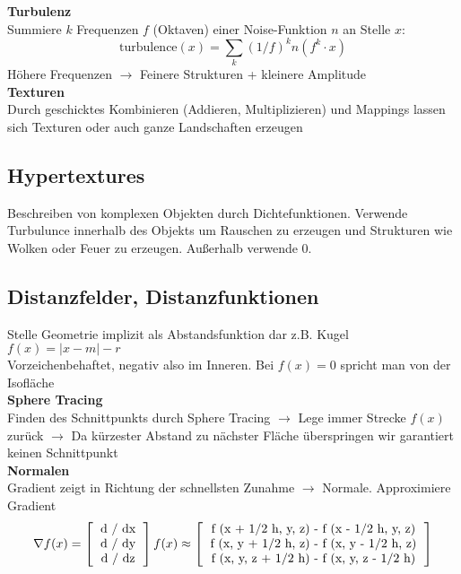 \textbf{Turbulenz}\\
Summiere $k$ Frequenzen $f$ (Oktaven) einer Noise-Funktion $n$ an Stelle $x$:\\
$$\text{turbulence}(x) = \sum_k (1 / f)^k n(f^k \cdot x)$$
Höhere Frequenzen $\rightarrow$ Feinere Strukturen + kleinere Amplitude\\

\textbf{Texturen}\\
Durch geschicktes Kombinieren (Addieren, Multiplizieren) und Mappings lassen sich Texturen oder auch
ganze Landschaften erzeugen

\subsection{Hypertextures}%
\label{pm:sub:hypertextures}

Beschreiben von komplexen Objekten durch Dichtefunktionen. Verwende Turbulunce innerhalb des Objekts
um Rauschen zu erzeugen und Strukturen wie Wolken oder Feuer zu erzeugen. Außerhalb verwende 0.

\subsection{Distanzfelder, Distanzfunktionen}%
\label{pm:sub:distanzfelder_distanzfunktionen}

Stelle Geometrie implizit als Abstandsfunktion dar z.B. Kugel $f(x) = | x - m | - r$\\
Vorzeichenbehaftet, negativ also im Inneren. Bei $f(x) = 0$ spricht man von der Isofläche\\

\textbf{Sphere Tracing}\\
Finden des Schnittpunkts durch Sphere Tracing $\rightarrow$ Lege immer Strecke $f(x)$ zurück
$\rightarrow$ Da kürzester Abstand zu nächster Fläche überspringen wir garantiert keinen Schnittpunkt\\

\textbf{Normalen}\\
Gradient zeigt in Richtung der schnellsten Zunahme $\rightarrow$ Normale. Approximiere Gradient
$$\nabla f(x) = \left[
    \begin{tabular}{c}
      d / dx\\
      d / dy \\
      d / dz\\
      \end{tabular}
    \right] f(x)
    \approx
    \left[
      \begin{tabular}{c}
        f (x + 1/2 h, y, z) - f (x - 1/2 h, y, z)\\
        f (x, y + 1/2 h, z) - f (x, y - 1/2 h, z)\\
        f (x, y, z + 1/2 h) - f (x, y, z - 1/2 h)\\
      \end{tabular}
    \right]
  $$


